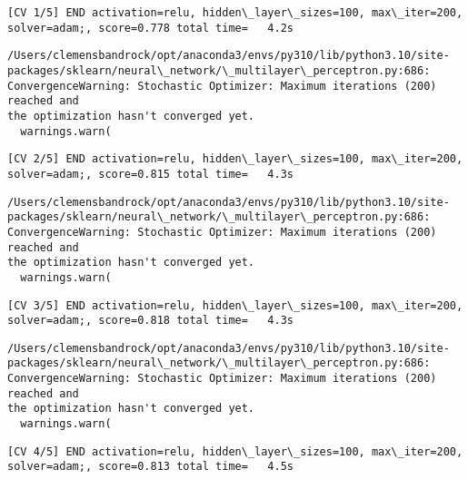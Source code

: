 \documentclass[11pt]{article}
\begin{document}
    \begin{Verbatim}[commandchars=\\\{\}]
[CV 1/5] END activation=relu, hidden\_layer\_sizes=100, max\_iter=200,
solver=adam;, score=0.778 total time=   4.2s
    \end{Verbatim}

    \begin{Verbatim}[commandchars=\\\{\}]
/Users/clemensbandrock/opt/anaconda3/envs/py310/lib/python3.10/site-
packages/sklearn/neural\_network/\_multilayer\_perceptron.py:686:
ConvergenceWarning: Stochastic Optimizer: Maximum iterations (200) reached and
the optimization hasn't converged yet.
  warnings.warn(
    \end{Verbatim}

    \begin{Verbatim}[commandchars=\\\{\}]
[CV 2/5] END activation=relu, hidden\_layer\_sizes=100, max\_iter=200,
solver=adam;, score=0.815 total time=   4.3s
    \end{Verbatim}

    \begin{Verbatim}[commandchars=\\\{\}]
/Users/clemensbandrock/opt/anaconda3/envs/py310/lib/python3.10/site-
packages/sklearn/neural\_network/\_multilayer\_perceptron.py:686:
ConvergenceWarning: Stochastic Optimizer: Maximum iterations (200) reached and
the optimization hasn't converged yet.
  warnings.warn(
    \end{Verbatim}

    \begin{Verbatim}[commandchars=\\\{\}]
[CV 3/5] END activation=relu, hidden\_layer\_sizes=100, max\_iter=200,
solver=adam;, score=0.818 total time=   4.3s
    \end{Verbatim}

    \begin{Verbatim}[commandchars=\\\{\}]
/Users/clemensbandrock/opt/anaconda3/envs/py310/lib/python3.10/site-
packages/sklearn/neural\_network/\_multilayer\_perceptron.py:686:
ConvergenceWarning: Stochastic Optimizer: Maximum iterations (200) reached and
the optimization hasn't converged yet.
  warnings.warn(
    \end{Verbatim}

    \begin{Verbatim}[commandchars=\\\{\}]
[CV 4/5] END activation=relu, hidden\_layer\_sizes=100, max\_iter=200,
solver=adam;, score=0.813 total time=   4.5s
    \end{Verbatim}
\end{document}
